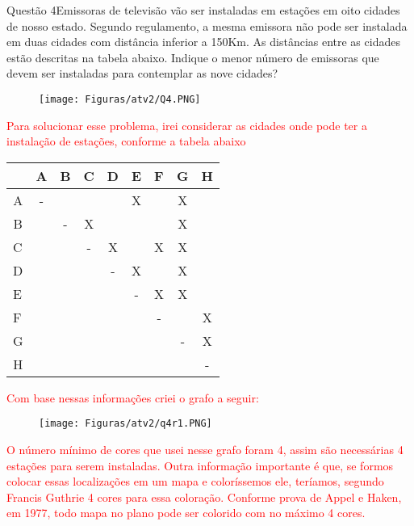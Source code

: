 \documentclass[12pt]{article}
\begin{document}
\begin{section}{Questão 4}{Emissoras de televisão vão ser instaladas em estações em oito cidades de nosso estado. Segundo regulamento, a mesma emissora não pode ser instalada em duas cidades com distância inferior a 150Km. As distâncias entre as cidades estão descritas na tabela abaixo. Indique o menor número de emissoras que
devem ser instaladas para contemplar as nove cidades?}\\

\begin{figure}[H]
    \centering
    \texttt{[image: Figuras/atv2/Q4.PNG]}
\end{figure}

\noindent \textcolor{red}{Para solucionar esse problema, irei considerar as cidades onde pode ter a instalação de estações, conforme a tabela abaixo}

\begin{table}[H]
\centering
\begin{tabular}{l|cccccccc}
\hline
\multicolumn{1}{c|}{} & \multicolumn{1}{l}{A} & \multicolumn{1}{l}{B} & \multicolumn{1}{l}{C} & \multicolumn{1}{l}{D} & \multicolumn{1}{l}{E} & \multicolumn{1}{l}{F} & \multicolumn{1}{l}{G} & H \\ \hline
\multicolumn{1}{c|}{A} & - &  &  &  & X &  & X &  \\
\multicolumn{1}{c|}{B} &  & - & X &  &  &  & X &  \\
C &  &  & - & X &  & X & X &  \\
D &  &  &  & - & X &  & X &  \\
E &  &  &  &  & - & X & X &  \\
F &  &  &  &  &  & - &  & X \\
G &  &  &  &  &  &  & - & X \\
\multicolumn{1}{c|}{H} &  &  &  &  &  &  &  & - \\ \hline
\end{tabular}%
\end{table}

\noindent \textcolor{red}{Com base nessas informações criei o grafo a seguir:}

\begin{figure}[H]
    \centering
    \texttt{[image: Figuras/atv2/q4r1.PNG]}
\end{figure}

\noindent \textcolor{red}{O número mínimo de cores que usei nesse grafo foram 4, assim são necessárias 4 estações para serem instaladas. Outra informação importante é que, se formos colocar essas localizações em um mapa e coloríssemos ele, teríamos, segundo Francis Guthrie 4 cores para essa coloração. Conforme prova de Appel e Haken, em 1977, todo mapa no plano pode ser colorido com no máximo 4 cores.}


\end{section}
\newpage
\end{document}
